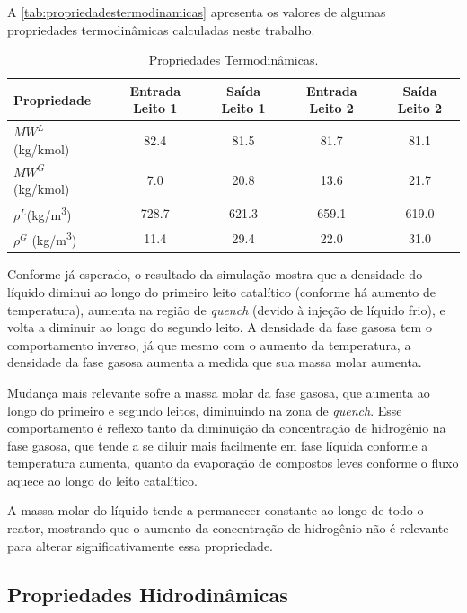 A \autoref{tab:propriedadestermodinamicas} apresenta os valores de algumas
propriedades termodinâmicas calculadas neste trabalho.

\begin{table}[!htb]
\begin{center}
\caption{Propriedades Termodinâmicas.}
\label{tab:propriedadestermodinamicas}
\small
\begin{tabular}{lcccc}
{Propriedade} & {Entrada Leito 1} & {Saída Leito 1} & {Entrada Leito 2} &
{Saída Leito 2}
\\
\hline
{$MW^{L}$ (\si{kg/kmol})} & \num{82,4} & \num{81,5} & \num{81,7} & \num{81,1} \\
{$MW^{G}$ (\si{kg/kmol})} & \num{7,0} & \num{20,8} & \num{13,6} & \num{21,7} \\
{$\rho^{L}$(\si{kg/m^3})} & \num{728,7} & \num{621,3} & \num{659,1} &
\num{619,0}
\\
{$\rho^{G}$ (\si{kg/m^3})} & \num{11,4} & \num{29,4} & \num{22,0} & \num{31,0}
\\
\bottomrule
\end{tabular}
\end{center}
\end{table}

Conforme já esperado, o resultado da simulação mostra que a densidade do
líquido diminui ao longo do primeiro leito catalítico (conforme há aumento de
temperatura), aumenta na região de \emph{quench} (devido à injeção de líquido
frio), e volta a diminuir ao longo do segundo leito. A densidade da fase gasosa
tem o comportamento inverso, já que mesmo com o aumento da temperatura, a
densidade da fase gasosa aumenta a medida que sua massa molar aumenta.

Mudança mais relevante sofre a massa molar da fase gasosa, que aumenta ao
longo do primeiro e segundo leitos, diminuindo na zona de \emph{quench}. Esse
comportamento é reflexo tanto da diminuição da concentração de hidrogênio na
fase gasosa, que tende a se diluir mais facilmente em fase líquida conforme a
temperatura aumenta, quanto da evaporação de compostos leves conforme o fluxo
aquece ao longo do leito catalítico.

A massa molar do líquido tende a permanecer constante ao longo de todo o
reator, mostrando que o aumento da concentração de hidrogênio não é relevante
para alterar significativamente essa propriedade.

\subsection{Propriedades Hidrodinâmicas} \label{propriedadeshidrodinâmicas}

